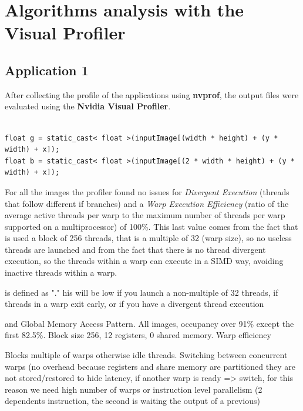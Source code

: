 \documentclass[a4paper]{article}
\begin{document}
\section{Algorithms analysis with the Visual Profiler}
\label{sec:vp}

\subsection{Application 1}
\label{sec:a1}
After collecting the profile of the applications using \textbf{nvprof}, the output files were evaluated using the \textbf{Nvidia Visual Profiler}.

\begin{lstlisting}[label=loop, caption=Sequential code]

float g = static_cast< float >(inputImage[(width * height) + (y * width) + x]);
float b = static_cast< float >(inputImage[(2 * width * height) + (y * width) + x]);

\end{lstlisting}
\FloatBarrier

For all the images the profiler found no issues for \textit{Divergent Execution} (threads that follow different if branches) and a \textit{Warp Execution Efficiency} (ratio of the average active threads per warp to the maximum number of threads per warp supported on a multiprocessor) of 100\%. This last value comes from the fact that is used a block of 256 threads, that is a multiple of 32 (warp size), so no useless threads are launched and from the fact that there is no thread divergent execution, so the threads within a warp can execute in a SIMD way, avoiding inactive threads within a warp. 

is defined as "." his will be low if you launch a non-multiple of 32 threads, if threads in a warp exit early, or if you have a divergent thread execution

 and Global Memory Access Pattern. All images, occupancy over 91\% except the first 82.5\%. Block size 256, 12 registers, 0 shared memory. Warp efficiency 
 


Blocks multiple of warps otherwise idle threads. Switching between concurrent warps (no overhead because registers and share memory are partitioned they are not stored/restored  to hide latency, if another warp is ready => switch, for this reason we need high number of warps or instruction level parallelism (2 dependents instruction, the second is waiting the output of a previous)
\end{document}
